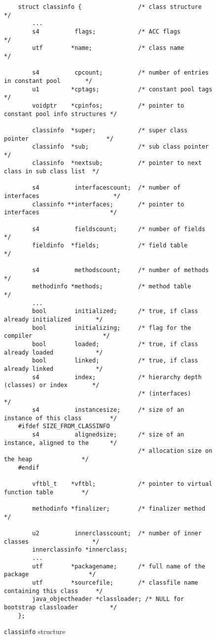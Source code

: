 \begin{figure}
\begin{verbatim}
    struct classinfo {                /* class structure                          */
        ...
        s4          flags;            /* ACC flags                                */
        utf        *name;             /* class name                               */

        s4          cpcount;          /* number of entries in constant pool       */
        u1         *cptags;           /* constant pool tags                       */
        voidptr    *cpinfos;          /* pointer to constant pool info structures */

        classinfo  *super;            /* super class pointer                      */
        classinfo  *sub;              /* sub class pointer                        */
        classinfo  *nextsub;          /* pointer to next class in sub class list  */

        s4          interfacescount;  /* number of interfaces                     */
        classinfo **interfaces;       /* pointer to interfaces                    */

        s4          fieldscount;      /* number of fields                         */
        fieldinfo  *fields;           /* field table                              */

        s4          methodscount;     /* number of methods                        */
        methodinfo *methods;          /* method table                             */
        ...
        bool        initialized;      /* true, if class already initialized       */
        bool        initializing;     /* flag for the compiler                    */
        bool        loaded;           /* true, if class already loaded            */
        bool        linked;           /* true, if class already linked            */
        s4          index;            /* hierarchy depth (classes) or index       */
                                      /* (interfaces)                             */
        s4          instancesize;     /* size of an instance of this class        */
    #ifdef SIZE_FROM_CLASSINFO
        s4          alignedsize;      /* size of an instance, aligned to the      */
                                      /* allocation size on the heap              */
    #endif

        vftbl_t    *vftbl;            /* pointer to virtual function table        */

        methodinfo *finalizer;        /* finalizer method                         */

        u2          innerclasscount;  /* number of inner classes                  */
        innerclassinfo *innerclass;
        ...
        utf        *packagename;      /* full name of the package                 */
        utf        *sourcefile;       /* classfile name containing this class     */
        java_objectheader *classloader; /* NULL for bootstrap classloader         */
    };
\end{verbatim}
\caption{\texttt{classinfo} structure}
\label{classinfostructure}
\end{figure}

